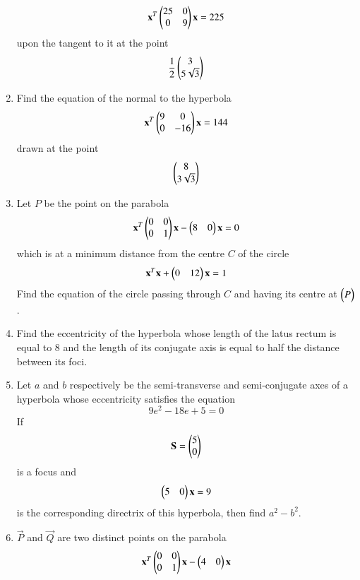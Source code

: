 \documentclass[journal,12pt,twocolumn]{IEEEtran}
\begin{document}
\begin{enumerate}[label=\arabic*.]
\begin{equation}
\mathbf{x}^T\begin{pmatrix}25 & 0 \\ 0 & 9\end{pmatrix}\mathbf{x}  = 225
\end{equation}
upon the tangent to it at the point
\begin{equation}
\frac{1}{2}\begin{pmatrix}3\\ 5 \sqrt{3}\end{pmatrix}
\end{equation}
\item Find the equation of the normal to the hyperbola
\begin{equation}
\mathbf{x}^T\begin{pmatrix}9 & 0 \\ 0 & -16\end{pmatrix}\mathbf{x}  = 144
\end{equation}
drawn at the point
\begin{equation}
\begin{pmatrix}8\\ 3 \sqrt{3}\end{pmatrix}
\end{equation}
\item Let $P$ be the point on the parabola
\begin{equation}
\mathbf{x}^T\begin{pmatrix}0 & 0 \\ 0 & 1\end{pmatrix}\mathbf{x} -\begin{pmatrix}8 & 0 \end{pmatrix}\mathbf{x} 
 = 0
\end{equation}
which is at a minimum distance from the centre $C$ of the circle
\begin{equation}
\mathbf{x}^T\mathbf{x} +\begin{pmatrix}0 & 12 \end{pmatrix}\mathbf{x} 
 = 1 
\end{equation} 
Find the equation of the circle passing through $C$ and having its centre at $\begin{pmatrix}P\end{pmatrix}$. 
\item Find the eccentricity of the hyperbola whose length of the latus rectum is equal to 8 and the length of 
its conjugate axis is equal to half the distance between its foci. 
\item Let $a$ and $b$ respectively be the semi-transverse and semi-conjugate axes of a hyperbola whose 
eccentricity satisfies the equation
\begin{equation}
9e^2-18e+5 = 0
\end{equation}
If 
\begin{equation} 
\mathbf{S}=\begin{pmatrix}5\\ 0\end{pmatrix}
\end{equation}
is a focus and 
\begin{equation} 
\begin{pmatrix}5 & 0\end{pmatrix}\mathbf{x} = 9
\end{equation} 
%
is the corresponding directrix of this hyperbola, then find $a^2-b^2$.
\item $\vec{P}$ and $\vec{Q}$ are two distinct points on the parabola
\begin{equation}
\vec{x}^T\myvec{0 & 0 \\ 0 & 1}\vec{x} -\myvec{4 & 0 }\vec{x} 

\end{equation}
\end{enumerate}
\end{document}
